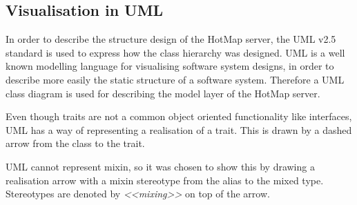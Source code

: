 \subsection{Visualisation in UML}
In order to describe the structure design of the HotMap server, the UML v2.5 standard is used to express how the class hierarchy was designed. UML is a well known modelling language for visualising software system designs, in order to describe more easily the static structure of a software system. Therefore a UML class diagram is used for describing the model layer of the HotMap server.

Even though traits are not a common object oriented functionality like interfaces, UML has a way of representing a realisation of a trait. This is drawn by a dashed arrow from the class to the trait.

UML cannot represent mixin, so it was chosen to show this by drawing a realisation arrow with a mixin stereotype from the alias to the mixed type. Stereotypes are denoted by \emph{<<mixing>>} on top of the arrow.